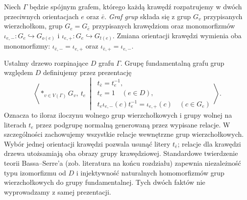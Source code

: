\begin{definicja}
Niech $\Gamma$ będzie spójnym grafem, którego każdą
krawędź rozpatrujemy w dwóch przeciwnych orientacjach
$e$ oraz $\bar e$. \emph{Graf grup} składa się z grup
$G_v$ przypisanych wierzchołkom, grup $G_e=G_{\bar e}$
przypisanych krawędziom oraz monomorfizmów
$\iota_{e,-}:G_e\hookrightarrow G_{o(e)}$ i
$\iota_{e,+}:G_e\hookrightarrow G_{t(e)}$.
Zmiana orientacji krawędzi wymienia oba monomorfizmy:
$\iota_{\bar e,-}=\iota_{e,+}$ oraz
$\iota_{\bar e,+}=\iota_{e,-}$.
\end{definicja}

\begin{definicja}
Ustalmy drzewo rozpinające $D$ grafu $\Gamma$.
Grupę fundamentalną grafu grup względem $D$
definiujemy przez prezentację
\[
 \left\langle *_{v\in V(\Gamma)}G_v,\ t_e
 \ \middle|\
 \begin{array}{l}
 t_{\bar e}=t_e^{-1},\\
 t_e=1\quad(e\in D),\\
 t_e\iota_{e,-}(c)t_e^{-1}=\iota_{e,+}(c)
       \quad(c\in G_e)
 \end{array}\right\rangle .
\]
Oznacza to iloraz iloczynu wolnego grup
wierzchołkowych i grupy wolnej na literach
$t_e$ przez podgrupę normalną generowaną
przez wypisane relacje. W szczególności zachowujemy
wszystkie relacje wewnętrzne grup wierzchołkowych.
Wybór jednej orientacji krawędzi pozwala usunąć
litery $t_{\bar e}$; relacje dla krawędzi drzewa
utożsamiają oba obrazy grupy krawędziowej.
Standardowe twierdzenie teorii Bassa--Serre'a
(zob. literatura na końcu rozdziału) zapewnia
niezależność typu izomorfizmu od $D$ i injektywność
naturalnych homomorfizmów grup wierzchołkowych
do grupy fundamentalnej. Tych dwóch faktów
nie wyprowadzamy z samej prezentacji.
\end{definicja}

